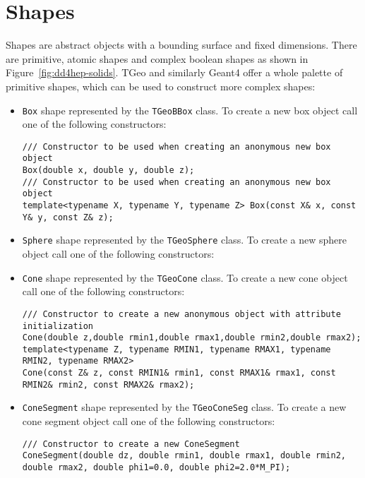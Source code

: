 \section{Shapes}
\label{dd4hep-basic-shapes}

Shapes are abstract objects with a bounding surface and fixed dimensions.  There are primitive, atomic shapes and complex boolean shapes as shown in Figure~\ref{fig:dd4hep-solids}.  TGeo and similarly Geant4 offer a whole palette of primitive shapes, which can be used to construct more complex shapes:
\begin{itemize}
\item \texttt{Box} shape represented by the \texttt{TGeoBBox} class. To create a new box object call one of the following constructors:
\begin{verbatim}
/// Constructor to be used when creating an anonymous new box object
Box(double x, double y, double z);
/// Constructor to be used when creating an anonymous new box object
template<typename X, typename Y, typename Z> Box(const X& x, const Y& y, const Z& z);
\end{verbatim}
\item \texttt{Sphere} shape represented by the \texttt{TGeoSphere} class. To create a new sphere object call one of the following constructors:
\item \texttt{Cone}  shape represented by the \texttt{TGeoCone} class. To create a new cone object call one of the following constructors:
\begin{verbatim}
/// Constructor to create a new anonymous object with attribute initialization
Cone(double z,double rmin1,double rmax1,double rmin2,double rmax2);
template<typename Z, typename RMIN1, typename RMAX1, typename RMIN2, typename RMAX2>
Cone(const Z& z, const RMIN1& rmin1, const RMAX1& rmax1, const RMIN2& rmin2, const RMAX2& rmax2);
\end{verbatim}
\item \texttt{ConeSegment} shape represented by the \texttt{TGeoConeSeg} class. To create a new cone segment object call one of the following constructors:
\begin{verbatim}
/// Constructor to create a new ConeSegment
ConeSegment(double dz, double rmin1, double rmax1, double rmin2, double rmax2, double phi1=0.0, double phi2=2.0*M_PI);

\end{verbatim}
\end{itemize}
